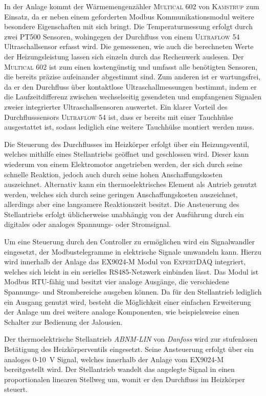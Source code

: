 In der Anlage kommt der Wärmemengenzähler \textsc{Multical 602} von \textsc{Kamstrup} zum Einsatz, da er neben einem geforderten Modbus Kommunikationsmodul weitere besondere Eigenschaften mit sich bringt. Die Temperaturmessung erfolgt durch zwei PT500 Sensoren, wohingegen der Durchfluss von einem \textsc{Ultraflow 54} Ultraschallsensor erfasst wird. Die gemessenen, wie auch die berechneten Werte der Heizungsleistung lassen sich einzeln durch das Rechenwerk auslesen.
Der \textsc{Multical 602} ist zum einen kostengünstig und umfasst alle benötigten Sensoren, die bereits präzise aufeinander abgestimmt sind. Zum anderen ist er wartungsfrei, da er den Durchfluss über kontaktlose Ultraschallmessungen bestimmt, indem er die Laufzeitdifferenz zwischen wechselseitig gesendeten und empfangenen Signalen zweier integrierter Ultraschallsensoren auswertet. Ein klarer Vorteil des Durchflusssensors \textsc{Ultraflow 54} ist, dass er bereits mit einer Tauchhülse ausgestattet ist, sodass lediglich eine weitere Tauchhülse montiert werden muss.


Die Steuerung des Durchflusses im Heizkörper erfolgt über ein Heizungsventil, welches mithilfe eines Stellantriebs geöffnet und geschlossen wird. Dieser kann wiederum von einem Elektromotor angetrieben werden, der sich durch seine schnelle Reaktion, jedoch auch durch seine hohen Anschaffungskosten auszeichnet. Alternativ kann ein thermoelektrisches Element als Antrieb genutzt werden, welches sich durch seine geringen Anschaffungskosten auszeichnet, allerdings aber eine langsamere Reaktionszeit besitzt. Die Ansteuerung des Stellantriebs erfolgt üblicherweise unabhängig von der Ausführung durch ein digitales oder analoges Spannungs- oder Stromsignal.

Um eine Steuerung durch den Controller zu ermöglichen wird ein Signalwandler eingesetzt, der Modbustelegramme in elektrische Signale umwandeln kann. Hierzu wird innerhalb der Anlage das \textsc{EX9024-M} Modul von \textsc{ExpertDAQ} integriert, welches sich leicht in ein serielles RS485-Netzwerk einbinden lässt. Das Modul ist Modbus RTU-fähig und besitzt vier analoge Ausgänge, die verschiedene Spannungs- und Strombereiche ausgeben können. Da für den Stellantrieb lediglich ein Ausgang genutzt wird, besteht die Möglichkeit einer einfachen Erweiterung der Anlage um drei weitere analoge Komponenten, wie beispielsweise einen Schalter zur Bedienung der Jalousien.

Der thermoelektrische Stellantrieb \textit{ABNM-LIN} von \textit{Danfoss} wird zur stufenlosen Betätigung des Heizkörperventils eingesetzt. Seine Ansteuerung erfolgt über ein analoges 0-10~V Signal, welches innerhalb der Anlage vom \textsc{EX9024-M} bereitgestellt wird. Der Stellantrieb wandelt das angelegte Signal in einen proportionalen linearen Stellweg um, womit er den Durchfluss im Heizkörper steuert.


